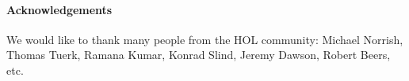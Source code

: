 
\paragraph{Acknowledgements}

We would like to thank many people from the HOL community:
Michael Norrish, Thomas Tuerk, 
Ramana Kumar, Konrad Slind, Jeremy Dawson, Robert Beers, etc.
